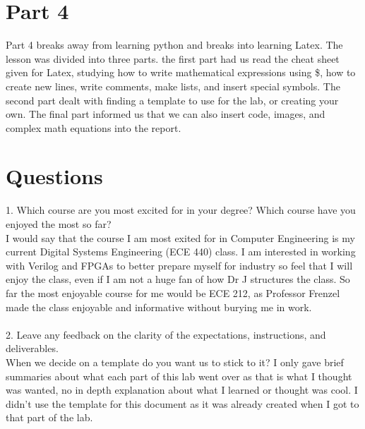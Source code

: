 \documentclass{article}
\begin{document}
\section{Part 4}
Part 4 breaks away from learning python and breaks into learning Latex. The lesson was divided into three parts. the first part had us read the cheat sheet given for Latex, studying how to write mathematical expressions using \$, how to create new lines, write comments, make lists, and insert special symbols. The second part dealt with finding a template to use for the lab, or creating your own. The final part informed us that we can also insert code, images, and complex math equations into the report.
\section{Questions}
1. Which course are you most excited for in your degree? Which course have you enjoyed the most so far?\\
I would say that the course I am most exited for in Computer Engineering is my current Digital Systems Engineering (ECE 440) class. I am interested in working with Verilog and FPGAs to better prepare myself for industry so feel that I will enjoy the class, even if I am not a huge fan of how Dr J structures the class. So far the most enjoyable course for me would be ECE 212, as Professor Frenzel made the class enjoyable and informative without burying me in work.\\
\\
2. Leave any feedback on the clarity of the expectations, instructions, and deliverables.\\
When we decide on a template do you want us to stick to it? I only gave brief summaries about what each part of this lab went over as that is what I thought was wanted, no in depth explanation about what I learned or thought was cool. I didn't use the template for this document as it was already created when I got to that part of the lab.
\end{document}
